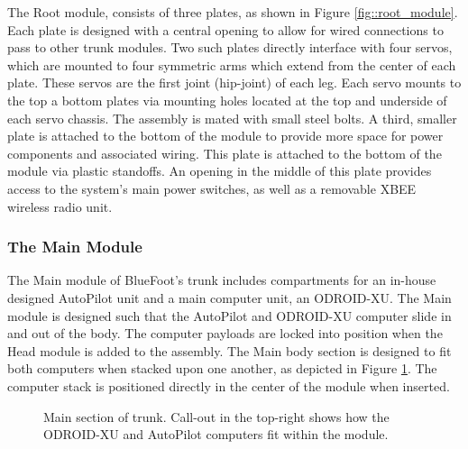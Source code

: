 				The Root module, consists of three plates, as shown in Figure \ref{fig::root_module}. Each plate is designed with a central opening to allow for wired connections to pass to other trunk modules. Two such plates directly interface with four servos, which are mounted to four symmetric arms which extend from the center of each plate. These servos are the first joint (hip-joint) of each leg. Each servo mounts to the top a bottom plates via mounting holes located at the top and underside of each servo chassis. The assembly is mated with small steel bolts. A third, smaller plate is attached to the bottom of the module to provide more space for power components and associated wiring. This plate is attached to the bottom of the module via plastic standoffs. An opening in the middle of this plate provides access to the system's main power switches, as well as a removable XBEE wireless radio unit.

			\subsubsection{The Main Module}
		
				The Main module of BlueFoot's trunk includes compartments for an in-house designed AutoPilot unit and a main computer unit, an ODROID-XU. The Main module is designed such that the AutoPilot and ODROID-XU computer slide in and out of the body. The computer payloads are locked into position when the Head module is added to the assembly. The Main body section is designed to fit both computers when stacked upon one another, as depicted in Figure \ref{fig::main_module}. The computer stack is positioned directly in the center of the module when inserted.
%
				\begin{figure}[h!]
					\centering
					\caption{Main section of trunk. Call-out in the top-right shows how the ODROID-XU and AutoPilot computers fit within the module.}
					\label{fig::main_module}
				\end{figure}

